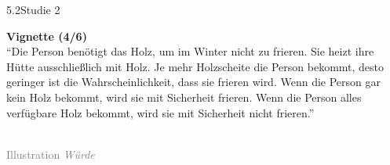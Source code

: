\documentclass[xcolor=table,9pt,aspectratio=169]{beamer}
\begin{document}
\begin{frame}{\vspace*{10mm}5.2\hspace*{1em}Studie 2}
\begin{multicols}{2}
   \textbf{Vignette (4/6)}\\
   \medskip
   \enquote{Die Person benötigt das Holz, um im Winter nicht zu frieren. Sie heizt ihre Hütte ausschließlich mit Holz. Je mehr Holzscheite die Person bekommt, desto geringer ist die Wahrscheinlichkeit, dass sie frieren wird. Wenn die Person gar kein Holz bekommt, wird sie mit Sicherheit frieren. Wenn die Person alles verfügbare Holz bekommt, wird sie mit Sicherheit nicht frieren.}\\
   \vfill
   \begin{center}
      \\
      \textcolor{gray}{Illustration \textit{Würde}}
   \end{center}
\end{multicols}
\end{frame}
\end{document}
